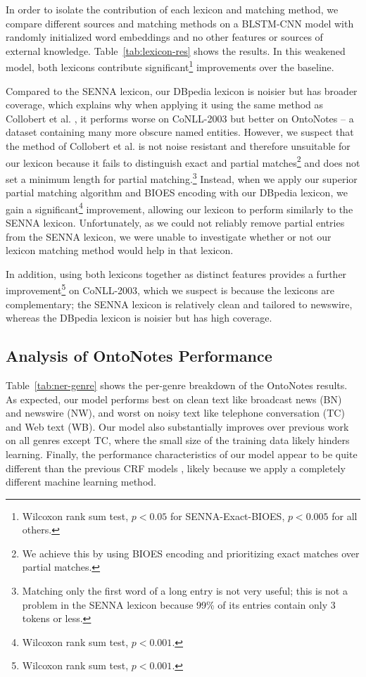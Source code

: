 \documentclass[11pt,letterpaper]{article}
\begin{document}
In order to isolate the contribution of each lexicon and matching method, we compare different sources and matching methods on a BLSTM-CNN model with randomly initialized word embeddings and no other features or sources of external knowledge. Table~\ref{tab:lexicon-res} shows the results. In this weakened model, both lexicons contribute significant\footnote{Wilcoxon rank sum test, $p < 0.05$ for SENNA-Exact-BIOES, $p < 0.005$ for all others.} improvements over the baseline.

Compared to the SENNA lexicon, our DBpedia lexicon is noisier but has broader coverage, which explains why when applying it using the same method as Collobert et al. , it performs worse on CoNLL-2003 but better on OntoNotes -- a dataset containing many more obscure named entities.
However, we suspect that the method of Collobert et al.  is not noise resistant and therefore unsuitable for our lexicon because it fails to distinguish exact and partial matches\footnote{We achieve this by using BIOES encoding and prioritizing exact matches over partial matches.} and does not set a minimum length for partial matching.\footnote{Matching only the first word of a long entry is not very useful; this is not a problem in the SENNA lexicon because 99\% of its entries contain only 3 tokens or less.}
Instead, when we apply our superior partial matching algorithm and BIOES encoding with our DBpedia lexicon, we gain a significant\footnote{Wilcoxon rank sum test, $p < 0.001$.} improvement, allowing our lexicon to perform similarly to the SENNA lexicon. 
Unfortunately, as we could not reliably remove partial entries from the SENNA lexicon, we were unable to investigate whether or not our lexicon matching method would help in that lexicon. 

In addition, using both lexicons together as distinct features provides a further improvement\footnote{Wilcoxon rank sum test, $p < 0.001$.} on CoNLL-2003, which we suspect is because the lexicons are complementary; the SENNA lexicon is relatively clean and tailored to newswire, whereas the DBpedia lexicon is noisier but has high coverage.





\subsection{Analysis of OntoNotes Performance}

Table~\ref{tab:ner-genre} shows the per-genre breakdown of the OntoNotes results. As expected, our model performs best on clean text like broadcast news (BN) and newswire (NW), and worst on noisy text like telephone conversation (TC) and Web text (WB). Our model also substantially improves over previous work on all genres except TC, where the small size of the training data likely hinders learning. Finally, the performance characteristics of our model appear to be quite different than the previous CRF models \cite{finkel2009,durrett2014}, likely because we apply a completely different machine learning method.
\end{document}
